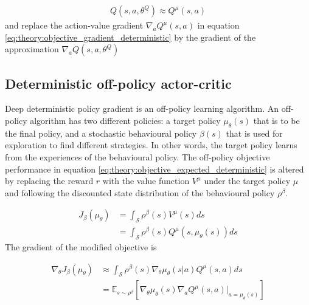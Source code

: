 \documentclass[class=book, crop=false, 11pt]{standalone}
\begin{document}
\begin{equation}
   \begin{aligned}\label{eq:theory:action-value_approx}
    Q(s,a,\theta^{Q}) \approx Q^{\mu}(s,a)
\end{aligned} 
\end{equation}
and replace the action-value gradient $\nabla_{a} Q^{\mu}(s,a)$ in equation \eqref{eq:theory:objective_gradient_deterministic} by
the gradient of the approximation $\nabla_{a} Q(s,a,\theta^{Q})$

\subsection{Deterministic off-policy actor-critic}
Deep deterministic policy gradient is an off-policy learning algorithm. An off-policy algorithm has two different policies: a target policy $\mu_{\theta}(s)$ that is to be the final policy, and a stochastic behavioural policy $\beta(s)$ that is used for exploration to find different strategies. In other words, the target policy learns from the experiences of the behavioural policy. The off-policy objective performance in equation \eqref{eq:theory:objective_expected_deterministic} is altered by replacing the reward $r$ with the value function $V^{\mu}$ under the target policy $\mu$ and following the discounted state distribution of the behavioural policy $\rho^{\beta}$.

\begin{equation}
   \begin{aligned}\label{eq:theory:objective_expected_ooff_policy}
    J_{\beta}(\mu_{\theta}) &=
    \int_{\mathcal{S}}
    \rho^{\beta}(s)V^{\mu}(s) ds 
    \\
    &=
    \int_{\mathcal{S}}
    \rho^{\beta}(s)Q^{\mu}(s,\mu_{\theta}(s)) ds
\end{aligned} 
\end{equation}
The gradient of the modified objective is

\begin{equation}
   \begin{aligned}\label{eq:theory:objective_gradient_deterministic_off_policy}
    \nabla_{\theta}J_{\beta}(\mu_{\theta}) &\approx
    \int_{\mathcal{S}}
    \rho^{\beta}(s)
    \nabla_{\theta} \mu_{\theta}(s|a)
    Q^{\mu}(s,a)ds 
    \\
    &= \mathbb{E}_{s\sim \rho^{\beta}}
    [\nabla_{\theta} \mu_{\theta}(s)
    \nabla_{a} Q^{\mu}(s,a)|_{a = \mu_{\theta}(s)}]
\end{aligned} 
\end{equation}
\end{document}
